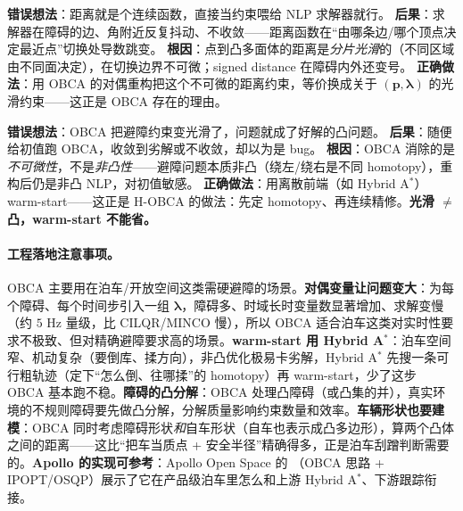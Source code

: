 \begin{pitfall}
\textbf{错误想法}：距离就是个连续函数，直接当约束喂给 NLP 求解器就行。\;
\textbf{后果}：求解器在障碍的边、角附近反复抖动、不收敛——距离函数在“由哪条边/哪个顶点决定最近点”切换处导数跳变。\;
\textbf{根因}：点到凸多面体的距离是\emph{分片光滑}的（不同区域由不同面决定），在切换边界不可微；signed distance 在障碍内外还变号。\;
\textbf{正确做法}：用 OBCA 的对偶重构把这个不可微的距离约束，等价换成关于 $(\mathbf p,\boldsymbol\lambda)$ 的光滑约束——这正是 OBCA 存在的理由。
\end{pitfall}

\begin{pitfall}
\textbf{错误想法}：OBCA 把避障约束变光滑了，问题就成了好解的凸问题。\;
\textbf{后果}：随便给初值跑 OBCA，收敛到劣解或不收敛，却以为是 bug。\;
\textbf{根因}：OBCA 消除的是\emph{不可微性}，不是\emph{非凸性}——避障问题本质非凸（绕左/绕右是不同 homotopy），重构后仍是非凸 NLP，对初值敏感。\;
\textbf{正确做法}：用离散前端（如 Hybrid A$^*$）warm-start——这正是 H-OBCA 的做法：先定 homotopy、再连续精修。\textbf{光滑 $\ne$ 凸，warm-start 不能省。}
\end{pitfall}

\paragraph{工程落地注意事项。}
OBCA 主要用在泊车/开放空间这类需硬避障的场景。\textbf{对偶变量让问题变大}：为每个障碍、每个时间步引入一组 $\boldsymbol\lambda$，障碍多、时域长时变量数显著增加、求解变慢（约 $5$ Hz 量级，比 CILQR/MINCO 慢），所以 OBCA 适合泊车这类对实时性要求不极致、但对精确避障要求高的场景。\textbf{warm-start 用 Hybrid A$^*$}：泊车空间窄、机动复杂（要倒库、揉方向），非凸优化极易卡劣解，Hybrid A$^*$ 先搜一条可行粗轨迹（定下“怎么倒、往哪揉”的 homotopy）再 warm-start，少了这步 OBCA 基本跑不稳。\textbf{障碍的凸分解}：OBCA 处理凸障碍（或凸集的并），真实环境的不规则障碍要先做凸分解，分解质量影响约束数量和效率。\textbf{车辆形状也要建模}：OBCA 同时考虑障碍形状\emph{和}自车形状（自车也表示成凸多边形），算两个凸体之间的距离——这比“把车当质点 + 安全半径”精确得多，正是泊车刮蹭判断需要的。\textbf{Apollo 的实现可参考}：Apollo Open Space 的 \verb@DistanceApproachProblem@（OBCA 思路 + IPOPT/OSQP）展示了它在产品级泊车里怎么和上游 Hybrid A$^*$、下游跟踪衔接。

